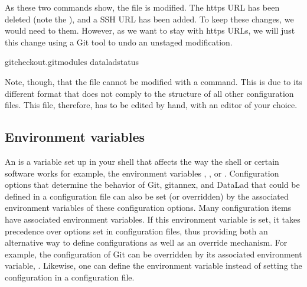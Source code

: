 \sphinxAtStartPar
As these two commands show, the  file is modified. The https URL
has been deleted (note the \sphinxcode{\sphinxupquote{\sphinxhyphen{}}}), and a SSH URL has been added. To keep these
changes, we would need to  them. However, as we want to stay with
https URLs, we will just  this change \textendash{} using a Git tool to undo an
unstaged modification.

\begin{sphinxVerbatim}[commandchars=\\\{\}]
gitcheckout.gitmodules
dataladstatus
\end{sphinxVerbatim}

\sphinxAtStartPar
Note, though, that the  file cannot be modified with a 
command. This is due to its different format that does not comply to the
 structure of all other configuration files. This file, therefore,
has to be edited by hand, with an editor of your choice.

\ignorespaces 

\subsection{Environment variables}
\label{\detokenize{basics/101-123-config2:environment-variables}}\label{\detokenize{basics/101-123-config2:envvars}}\label{\detokenize{basics/101-123-config2:index-5}}
\sphinxAtStartPar
An {\hyperref[\detokenize{glossary:term-environment-variable}]{}} is a variable set up in your shell
that affects the way the shell or certain software works \textendash{} for example,
the environment variables , , or .
Configuration options that determine the behavior of Git, git\sphinxhyphen{}annex, and
DataLad that could be defined in a configuration file can also be set (or overridden)
by the associated environment variables of these configuration options.
Many configuration items have associated environment variables.
If this environment variable is set, it takes precedence over options set in
configuration files, thus providing both an alternative way to define configurations
as well as an override mechanism. For example, the 
configuration of Git can be overridden by its associated environment variable,
. Likewise, one can define the environment variable instead
of setting the  configuration in a configuration file.

